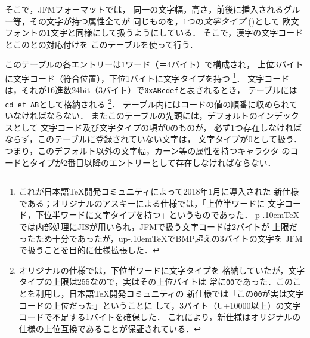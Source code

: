 \documentclass[a4paper,11pt,nomag]{jsarticle}
\def\code#1{\texttt{#1}}
\def\pTeX{p\kern-.10em\TeX}\def\upTeX{u\pTeX}
\begin{document}
そこで，JFMフォーマットでは，
同一の文字幅，高さ，前後に挿入されるグルー等，その文字が持つ属性全てが
同じものを，1つの\emph{文字タイプ} ()として
欧文フォントの1文字と同様にして扱うようにしている．
そこで，漢字の文字コードとこのとの対応付けを
このテーブルを使って行う．

このテーブルの各エントリーは1ワード（＝4バイト）で構成され，
上位3バイトに文字コード（符合位置），下位1バイトに文字タイプを持つ
\footnote{これが日本語\TeX{}開発コミュニティによって2018年1月に導入された
新仕様である；オリジナルのアスキーによる仕様では，「上位半ワードに
文字コード，下位半ワードに文字タイプを持つ」というものであった．
\pTeX{}では内部処理にJISが用いられ，JFMで扱う文字コードは2バイトが
上限だったため十分であったが，\upTeX{}でBMP超えの3バイトの文字を
JFMで扱うことを目的に仕様拡張した．}．
文字コードは，それが16進数24bit（3バイト）で\code{0xABcdef}と表されるとき，
テーブルには\code{cd ef AB}として格納される
\footnote{オリジナルの仕様では，下位半ワードに文字タイプを
格納していたが，文字タイプの上限は255なので，実はその上位バイトは
常に\code{00}であった．このことを利用し，日本語\TeX{}開発コミュニティの
新仕様では「この\code{00}が実は文字コードの上位だった」ということに
して，3バイト（U+10000以上）の文字コードで不足する1バイトを確保した．
これにより，新仕様はオリジナルの仕様の上位互換であることが保証されている．}．
テーブル内にはコードの値の順番に収められていなければならない．
またこのテーブルの先頭には，デフォルトのインデックスとして
文字コード及び文字タイプの項が0のものが，
必ず1つ存在しなければならず，このテーブルに登録されていない文字は，
文字タイプが0として扱う．
つまり，このデフォルト以外の文字幅，カーン等の属性を持つキャラクタ
のコードとタイプが2番目以降のエントリーとして存在しなければならない．
\end{document}
